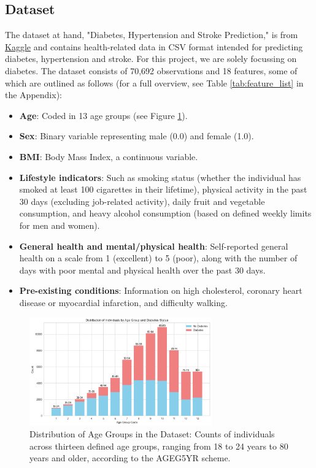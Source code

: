 \documentclass[a4paper,12pt]{article}
\begin{document}
\subsection{Dataset}
The dataset at hand, "Diabetes, Hypertension and Stroke Prediction," is from \href{https://www.kaggle.com/datasets/prosperchuks/health-dataset/data}{Kaggle} and contains 
health-related data in CSV format intended for predicting diabetes, hypertension and stroke. 
For this project, we are solely focussing on diabetes. The dataset consists of 70,692 observations 
and 18 features, some of which are outlined as follows (for a full overview, see Table \ref{tab:feature_list} in the Appendix):
\begin{itemize}
    \item \textbf{Age}: Coded in 13 age groups (see Figure \ref{fig:age_groups}).
    \item \textbf{Sex}: Binary variable representing male (0.0) and female (1.0).
    \item \textbf{BMI}: Body Mass Index, a continuous variable.
    \item \textbf{Lifestyle indicators}: Such as smoking status (whether the individual has smoked 
    at least 100 cigarettes in their lifetime), physical activity in the past 30 days 
    (excluding job-related activity), daily fruit and vegetable consumption, and heavy alcohol 
    consumption (based on defined weekly limits for men and women).
    \item \textbf{General health and mental/physical health}: Self-reported general health on a 
    scale from 1 (excellent) to 5 (poor), along with the number of days with poor mental and 
    physical health over the past 30 days.
    \item \textbf{Pre-existing conditions}: Information on high cholesterol, coronary heart 
    disease or myocardial infarction, and difficulty walking.
\end{itemize}

\begin{figure}[h!]
    \centering
    \includegraphics[width=0.7\textwidth]{plot_age_groups.png}
    \caption{Distribution of Age Groups in the Dataset: Counts of individuals across thirteen defined age groups, 
    ranging from 18 to 24 years to 80 years and older, according to the AGEG5YR scheme.}
    \label{fig:age_groups}
\end{figure}
\end{document}
